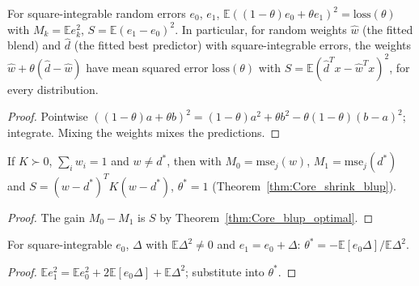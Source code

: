 \begin{theorem}\label{thm:plugIn_mix}
  \leanok
  For square-integrable random errors $e_0$, $e_1$,
  $\mathbb E((1-\theta)e_0 + \theta e_1)^2 = \mathrm{loss}(\theta)$ with $M_k = \mathbb E e_k^2$,
  $S = \mathbb E(e_1 - e_0)^2$. In particular, for random weights $\hat w$ (the fitted blend) and
  $\hat d$ (the fitted best predictor) with square-integrable errors, the weights
  $\hat w + \theta(\hat d - \hat w)$ have mean squared error $\mathrm{loss}(\theta)$ with
  $S = \mathbb E(\hat d^Tx - \hat w^Tx)^2$, for every distribution.
\end{theorem}
\begin{proof}
  \leanok
  Pointwise $((1-\theta)a + \theta b)^2 = (1-\theta)a^2 + \theta b^2 - \theta(1-\theta)(b-a)^2$;
  integrate. Mixing the weights mixes the predictions.
\end{proof}

\begin{corollary}\label{cor:bestMix_blup}
  \leanok
  If $K \succ 0$, $\sum_i w_i = 1$ and $w \ne d^*$, then with $M_0 = \mathrm{mse}_j(w)$,
  $M_1 = \mathrm{mse}_j(d^*)$ and $S = (w - d^*)^TK(w - d^*)$, $\theta^* = 1$
  (Theorem~\ref{thm:Core_shrink_blup}).
\end{corollary}
\begin{proof}
  \leanok
  The gain $M_0 - M_1$ is $S$ by Theorem~\ref{thm:Core_blup_optimal}.
\end{proof}

\begin{theorem}\label{thm:bestMix_regression}
  \leanok
  For square-integrable $e_0$, $\Delta$ with $\mathbb E\Delta^2 \ne 0$ and $e_1 = e_0 + \Delta$:
  $\theta^* = -\mathbb E[e_0\Delta]/\mathbb E\Delta^2$.
\end{theorem}
\begin{proof}
  \leanok
  $\mathbb E e_1^2 = \mathbb E e_0^2 + 2\mathbb E[e_0\Delta] + \mathbb E\Delta^2$; substitute into
  $\theta^*$.
\end{proof}

